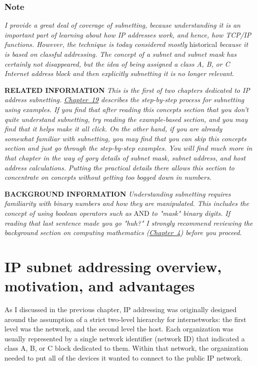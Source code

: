 \documentclass[b5paper,11pt]{memoir}
\begin{document}
\subsubsection[Note]{\texorpdfstring{\protect\hypertarget{ch18.htmlux5cux23note-69}{}{}Note}{Note}}

{\emph{I provide a great deal of coverage of subnetting, because
understanding it is an important part of learning about how IP addresses
work, and hence, how TCP/IP functions. However, the technique is today
considered mostly}} historical {\emph{because it is based on classful
addressing. The concept of a subnet and subnet mask has certainly not
disappeared, but the idea of being assigned a class A, B, or C Internet
address block and then explicitly subnetting it is no longer relevant}}.


{\textbf{RELATED INFORMATION}} {\emph{This is the first of two chapters
dedicated to IP address subnetting.
\protect\hyperlink{ch19.html}{Chapter~19} describes the step-by-step
process for subnetting using examples. If you find that after reading
this concepts section that you don't quite understand subnetting, try
reading the example-based section, and you may find that it helps make
it all click. On the other hand, if you are already somewhat familiar
with subnetting, you may find that you can skip this concepts section
and just go through the step-by-step examples. You will find much more
in that chapter in the way of gory details of subnet mask, subnet
address, and host address calculations. Putting the practical details
there allows this section to concentrate on concepts without getting too
bogged down in numbers}}.


{\textbf{BACKGROUND INFORMATION}} {\emph{Understanding subnetting
requires familiarity with binary numbers and how they are manipulated.
This includes the concept of using boolean operators such as}} AND
{\emph{to "mask" binary digits. If reading that last sentence made you
go "huh?" I strongly recommend reviewing the background section on
computing mathematics (\protect\hyperlink{ch04.html}{Chapter~4}) before
you proceed}}.




\section{IP subnet addressing overview, motivation, and advantages}

As I discussed in the previous chapter, IP addressing was originally
designed around the assumption of a strict two-level hierarchy for
internetworks: the first level was the network, and the second level the
host. Each organization was usually represented by a single network
identifier (network ID) that indicated a class A, B, or C block
dedicated to them. Within that network, the organization needed to put
all of the devices it wanted to connect to the public IP network.
\end{document}
